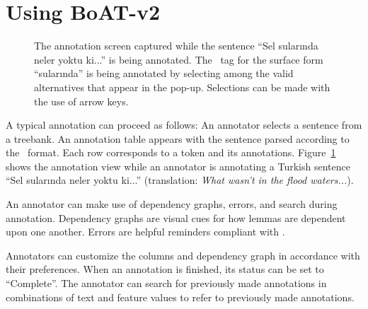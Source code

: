 \section{Using BoAT-v2}
\label{sec:annotation}

\begin{figure}[th!]
    \centering
    \caption{The annotation screen captured while the sentence ``Sel sularında neler yoktu ki...'' is being annotated. The \deprel\ tag for the surface form ``sularında'' is being annotated by selecting among the valid alternatives that appear in the pop-up. Selections can be made with the use of arrow keys.}
    \label{fig:anno-fig}
\end{figure}

A typical annotation can proceed as follows:
An annotator selects a sentence from a treebank.
An annotation table appears with the sentence parsed according to the \ud\ format.
Each row corresponds to a token and its annotations.
Figure~\ref{fig:anno-fig} shows the annotation view while an annotator is annotating a Turkish sentence ``Sel sularında neler yoktu ki...'' (translation: \textit{What wasn't in the flood waters...}).

An annotator can make use of dependency graphs, errors, and search during annotation.
Dependency graphs are visual cues for how lemmas are dependent upon one another.
Errors are helpful reminders compliant with \ud.

Annotators can customize the columns and dependency graph in accordance with their preferences.
When an annotation is finished, its status can be set to ``Complete''.
The annotator can search for previously made annotations in combinations of text and feature values to refer to previously made annotations.
